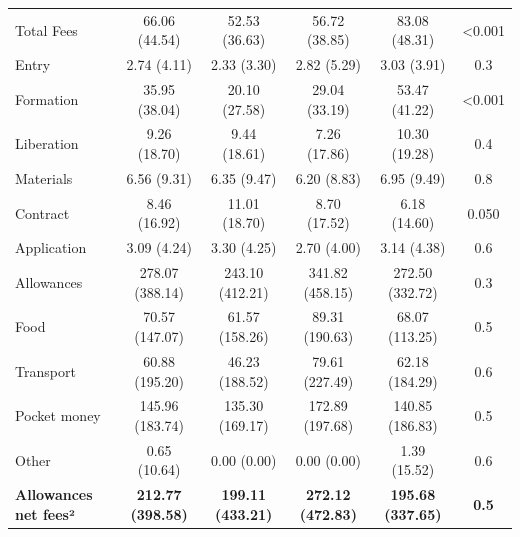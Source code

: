 \documentclass[
  11pt,
a4paper
]{article}
\begin{document}
\begin{table}[H]
{\begin{threeparttable}
\begin{tabular}[t]{lccccc}
\hspace{1em}Total Fees & 66.06 (44.54) & 52.53 (36.63) & 56.72 (38.85) & 83.08 (48.31) & <0.001\\
\hspace{1em}\hspace{1em}Entry & 2.74 (4.11) & 2.33 (3.30) & 2.82 (5.29) & 3.03 (3.91) & 0.3\\
\hspace{1em}\hspace{1em}Formation & 35.95 (38.04) & 20.10 (27.58) & 29.04 (33.19) & 53.47 (41.22) & <0.001\\
\hspace{1em}\hspace{1em}Liberation & 9.26 (18.70) & 9.44 (18.61) & 7.26 (17.86) & 10.30 (19.28) & 0.4\\
\hspace{1em}\hspace{1em}Materials & 6.56 (9.31) & 6.35 (9.47) & 6.20 (8.83) & 6.95 (9.49) & 0.8\\
\hspace{1em}\hspace{1em}Contract & 8.46 (16.92) & 11.01 (18.70) & 8.70 (17.52) & 6.18 (14.60) & 0.050\\
\hspace{1em}\hspace{1em}Application & 3.09 (4.24) & 3.30 (4.25) & 2.70 (4.00) & 3.14 (4.38) & 0.6\\
\hspace{1em}Allowances & 278.07 (388.14) & 243.10 (412.21) & 341.82 (458.15) & 272.50 (332.72) & 0.3\\
\hspace{1em}\hspace{1em}Food & 70.57 (147.07) & 61.57 (158.26) & 89.31 (190.63) & 68.07 (113.25) & 0.5\\
\hspace{1em}\hspace{1em}Transport & 60.88 (195.20) & 46.23 (188.52) & 79.61 (227.49) & 62.18 (184.29) & 0.6\\
\hspace{1em}\hspace{1em}Pocket money & 145.96 (183.74) & 135.30 (169.17) & 172.89 (197.68) & 140.85 (186.83) & 0.5\\
\hspace{1em}\hspace{1em}Other & 0.65 (10.64) & 0.00 (0.00) & 0.00 (0.00) & 1.39 (15.52) & 0.6\\
\textbf{\hspace{1em}Allowances net fees²} & \textbf{212.77 (398.58)} & \textbf{199.11 (433.21)} & \textbf{272.12 (472.83)} & \textbf{195.68 (337.65)} & \textbf{0.5}\\

\end{tabular}
\end{threeparttable}}
\end{table}
\end{document}
